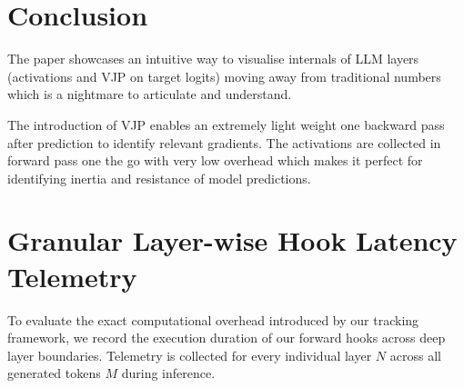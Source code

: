 \documentclass[10pt,conference]{IEEEtran}
\begin{document}
\section{Conclusion}
The paper showcases an intuitive way to visualise internals of LLM layers (activations and VJP on target logits) moving away from traditional numbers which is a nightmare to articulate and understand. 

The introduction of VJP enables an extremely light weight one backward pass after prediction to identify relevant gradients. The activations are collected in forward pass one the go with very low overhead which makes it perfect for identifying inertia and resistance of model predictions.

\newpage



\newpage
\appendices

\section{Granular Layer-wise Hook Latency Telemetry}
\label{appendix:latency_telemetry}

To evaluate the exact computational overhead introduced by our tracking framework, we record the execution duration of our forward hooks across deep layer boundaries. Telemetry is collected for every individual layer $N$ across all generated tokens $M$ during inference. 
\end{document}
